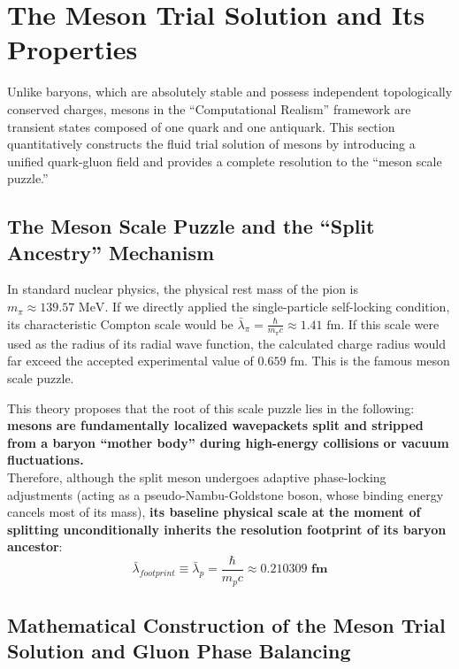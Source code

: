\documentclass[12pt, a4paper]{article}
\begin{document}
\section{The Meson Trial Solution and Its Properties}

Unlike baryons, which are absolutely stable and possess independent topologically conserved charges, mesons in the ``Computational Realism'' framework are transient states composed of one quark and one antiquark. This section quantitatively constructs the fluid trial solution of mesons by introducing a unified quark-gluon field and provides a complete resolution to the ``meson scale puzzle.''

\subsection{The Meson Scale Puzzle and the ``Split Ancestry'' Mechanism}

In standard nuclear physics, the physical rest mass of the pion is $m_\pi \approx 139.57 \text{ MeV}$. If we directly applied the single-particle self-locking condition, its characteristic Compton scale would be $\bar{\lambda}_\pi = \frac{\hbar}{m_\pi c} \approx 1.41 \text{ fm}$. If this scale were used as the radius of its radial wave function, the calculated charge radius would far exceed the accepted experimental value of \textbf{$0.659 \text{ fm}$}. This is the famous meson scale puzzle.

This theory proposes that the root of this scale puzzle lies in the following: \textbf{mesons are fundamentally localized wavepackets split and stripped from a baryon ``mother body'' during high-energy collisions or vacuum fluctuations.} \\
Therefore, although the split meson undergoes adaptive phase-locking adjustments (acting as a pseudo-Nambu-Goldstone boson, whose binding energy cancels most of its mass), \textbf{its baseline physical scale at the moment of splitting unconditionally inherits the resolution footprint of its baryon ancestor}:
\begin{equation}
\bar{\lambda}_{footprint} \equiv \bar{\lambda}_p = \frac{\hbar}{m_p c} \approx \mathbf{0.210309 \text{ fm}} \label{eq:meson_scale}
\end{equation}


\subsection{Mathematical Construction of the Meson Trial Solution and Gluon Phase Balancing}
\end{document}
